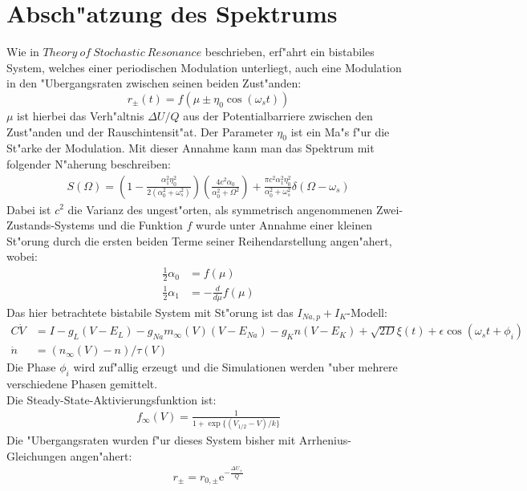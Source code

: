 \documentclass[12pt,a4paper]{article}
\begin{document}
\section{Absch"atzung des Spektrums}
Wie in $Theory\: of\: Stochastic\: Resonance$ beschrieben, erf"ahrt ein bistabiles System, welches einer periodischen Modulation unterliegt, auch eine Modulation in den "Ubergangsraten zwischen seinen beiden Zust"anden:
\begin{equation}
r_\pm(t)=f(\mu\pm\eta_0\cos(\omega_s t))
\end{equation}
$\mu$ ist hierbei das Verh"altnis $\Delta U/Q$ aus der Potentialbarriere zwischen den Zust"anden und der Rauschintensit"at. Der Parameter $\eta_0$ ist ein Ma"s f"ur die St"arke der Modulation. Mit dieser Annahme kann man das Spektrum mit folgender N"aherung beschreiben:
\begin{eqnarray}
S(\Omega)=\left(1-\frac{\alpha_1^2\eta_0^2}{2(\alpha_0^2+\omega_s^2)}\right)\left(\frac{4c^2\alpha_0}{\alpha_0^2+\Omega^2}\right)+\frac{\pi c^2\alpha_1^2\eta_0^2}{\alpha_0^2+\omega_s^2}\delta(\Omega-\omega_s)
\end{eqnarray}
Dabei ist $c^2$ die Varianz des ungest"orten, als symmetrisch angenommenen Zwei-Zustands-Systems und die Funktion $f$ wurde unter Annahme einer kleinen St"orung durch die ersten beiden Terme seiner Reihendarstellung angen"ahert, wobei:
\begin{align*}
\frac{1}{2}\alpha_0&=f(\mu)\\
\frac{1}{2}\alpha_1&=-\frac{d}{d\mu}f(\mu)
\end{align*} 
Das hier betrachtete bistabile System mit St"orung ist das $I_{Na,p}+I_K$-Modell:
	\begin{align*}
	C\dot{V} &= I - g_L(V-E_L) - g_{Na}m_{\infty}(V)(V-E_{Na}) - g_Kn(V-E_K)+\sqrt{2D}\xi(t)+\epsilon\cos(\omega_s t+\phi_i)\\
	\dot{n} &= (n_{\infty}(V)-n)/\tau(V)
	\end{align*}
Die Phase $\phi_i$ wird zuf"allig erzeugt und die Simulationen werden "uber mehrere verschiedene Phasen gemittelt.\\ Die Steady-State-Aktivierungsfunktion ist:
	\begin{align*}
	f_{\infty}(V) = \frac{1}{1+\exp\{(V_{1/2}-V)/k\}}
	\end{align*}
Die "Ubergangsraten wurden f"ur dieses System bisher mit Arrhenius-Gleichungen angen"ahert:
\begin{eqnarray}
r_{\pm}=r_{0,\pm}\text{e}^{-\frac{\Delta U_{\pm}}{Q}}
\end{eqnarray}
\end{document}
